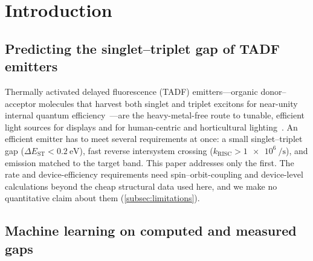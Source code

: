 
\section{Introduction}\label{sec:introduction}

\subsection{Predicting the singlet--triplet gap of TADF emitters}

Thermally activated delayed fluorescence (TADF) emitters---organic donor--acceptor
molecules that harvest both singlet and triplet excitons for near-unity internal
quantum efficiency~\cite{Uoyama2012}---are the heavy-metal-free route to tunable,
efficient light sources for displays and for human-centric and horticultural
lighting~\cite{Yokoyama_2018, Bugbee2016}. An efficient emitter has to meet several
requirements at once: a small singlet--triplet gap
($\Delta E_\text{ST} < \qty{0.2}{\electronvolt}$), fast reverse intersystem crossing
($k_\text{RISC} > \qty{1e6}{\per\second}$), and emission matched to the target band.
This paper addresses only the first. The rate and device-efficiency requirements need
spin--orbit-coupling and device-level calculations beyond the cheap structural data
used here, and we make no quantitative claim about them (\cref{subsec:limitations}).

\subsection{Machine learning on computed and measured gaps}

